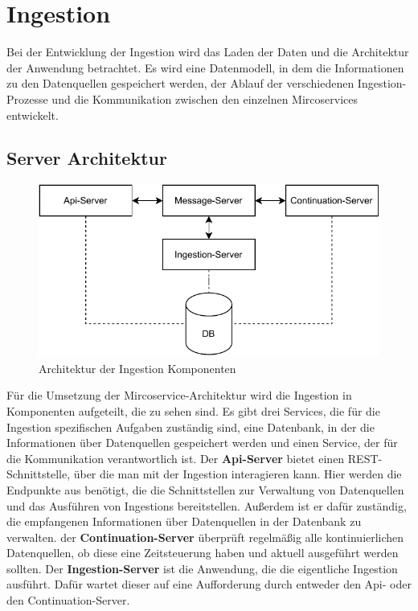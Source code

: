 \section{Ingestion}
Bei der Entwicklung der Ingestion wird das Laden der Daten und die Architektur der Anwendung betrachtet.
Es wird eine Datenmodell, in dem die Informationen zu den Datenquellen gespeichert werden, der Ablauf der verschiedenen Ingestion-Prozesse und die Kommunikation zwischen den einzelnen Mircoservices entwickelt.

\subsection{Server Architektur}
\label{sec:arch}

\begin{figure}
    \centering
    \includegraphics{Grafiken/ingestion-arch.pdf}
    \caption{Architektur der Ingestion Komponenten}
    \label{fig:ingestion_arch}
\end{figure}

Für die Umsetzung der Mircoservice-Architektur wird die Ingestion in Komponenten aufgeteilt, die  zu sehen sind.
Es gibt drei Services, die für die Ingestion spezifischen Aufgaben zuständig sind, eine Datenbank, in der die Informationen über Datenquellen gespeichert werden und einen Service, der für die Kommunikation verantwortlich ist.
Der \textbf{Api-Server} bietet einen REST-Schnittstelle, über die man mit der Ingestion interagieren kann.
Hier werden die Endpunkte aus  benötigt, die die Schnittstellen zur Verwaltung von Datenquellen und das Ausführen von Ingestions bereitstellen.
Außerdem ist er dafür zuständig, die empfangenen Informationen über Datenquellen in der Datenbank zu verwalten.
der \textbf{Continuation-Server} überprüft regelmäßig alle kontinuierlichen Datenquellen, ob diese eine Zeitsteuerung haben und aktuell ausgeführt werden sollten.
Der \textbf{Ingestion-Server} ist die Anwendung, die die eigentliche Ingestion ausführt.
Dafür wartet dieser auf eine Aufforderung durch entweder den Api- oder den Continuation-Server.

